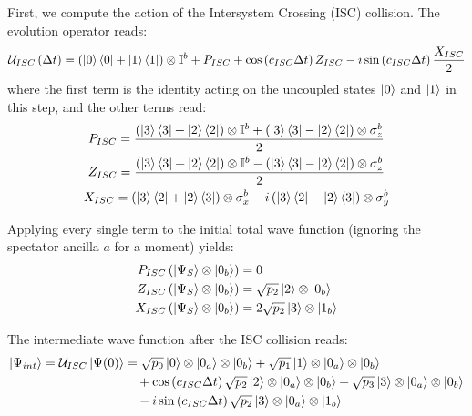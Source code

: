 \documentclass[a4paper,12pt]{article}
\begin{document}
First, we compute the action of the Intersystem Crossing (ISC) collision. The evolution operator reads:
\begin{equation}
	\mathcal{U}_{ISC} \left( \Delta t \right) = \left( \ket{0}\bra{0} + \ket{1}\bra{1} \right) \otimes \mathbb{I}^{b} + P_{ISC} + \cos \left( c_{ISC} \Delta t \right) Z_{ISC} - i \sin \left( c_{ISC} \Delta t \right) \frac{X_{ISC}}{2} 
\end{equation} 
where the first term is the identity acting on the uncoupled states $ \ket{0} $ and $ \ket{1} $ in this step, and the other terms read:
\begin{gather}
	P_{ISC} = \frac{\left( \ket{3}\bra{3} + \ket{2}\bra{2} \right) \otimes \mathbb{I}^{b} + \left( \ket{3}\bra{3} - \ket{2}\bra{2} \right) \otimes \sigma_{z}^{b} }{2} \\
	Z_{ISC} = \frac{\left( \ket{3}\bra{3} + \ket{2}\bra{2} \right) \otimes \mathbb{I}^{b} - \left( \ket{3}\bra{3} - \ket{2}\bra{2} \right) \otimes \sigma_{z}^{b} }{2} \\
	X_{ISC} = \left( \ket{3}\bra{2} + \ket{2}\bra{3} \right) \otimes \sigma_{x}^{b} - i \left( \ket{3}\bra{2} - \ket{2}\bra{3} \right) \otimes \sigma_{y}^{b}
\end{gather}

Applying every single term to the initial total wave function (ignoring the spectator ancilla $ a $ for a moment) yields: 
\begin{align}
	P_{ISC} \left( \ket{\Psi_{S}} \otimes \ket{0_{b}} \right) &= 0 \\
	Z_{ISC} \left( \ket{\Psi_{S}} \otimes \ket{0_{b}} \right) &= \sqrt{p_{2}} \ket{2} \otimes \ket{0_{b}} \\
	X_{ISC} \left( \ket{\Psi_{S}} \otimes \ket{0_{b}} \right) &= 2 \sqrt{p_{2}} \ket{3} \otimes \ket{1_{b}} 
\end{align}

The intermediate wave function after the ISC collision reads:
\begin{align}
	\ket{\Psi_{int}} = \mathcal{U}_{ISC} \ket{\Psi (0)} &= \sqrt{p_{0}} \ket{0} \otimes \ket{0_{a}} \otimes \ket{0_{b}} + \sqrt{p_{1}} \ket{1} \otimes \ket{0_{a}} \otimes \ket{0_{b}} \notag \\
	&\quad + \cos \left( c_{ISC} \Delta t \right) \sqrt{p_{2}} \ket{2} \otimes \ket{0_{a}} \otimes \ket{0_{b}} + \sqrt{p_{3}} \ket{3} \otimes \ket{0_{a}} \otimes \ket{0_{b}} \notag \\
	&\quad - i \sin \left( c_{ISC} \Delta t \right) \sqrt{p_{2}} \ket{3} \otimes \ket{0_{a}} \otimes \ket{1_{b}}
\end{align}
\end{document}
